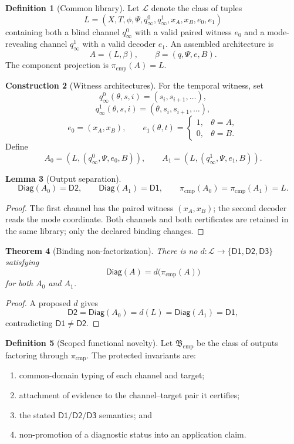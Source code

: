 \documentclass[11pt]{article}
\newcommand{\Diag}{\ensuremath{\mathsf{Diag}}}
\newcommand{\DOne}{\ensuremath{\mathsf{D1}}}
\newcommand{\DTwo}{\ensuremath{\mathsf{D2}}}
\newcommand{\DThree}{\ensuremath{\mathsf{D3}}}
\newcommand{\Lib}{\ensuremath{\mathcal L}}
\newcommand{\Base}{\ensuremath{\mathfrak B}}
\theoremstyle{plain}
\newtheorem{theorem}{Theorem}[section]
\newtheorem{lemma}[theorem]{Lemma}
\theoremstyle{definition}
\newtheorem{definition}[theorem]{Definition}
\newtheorem{construction}[theorem]{Construction}
\theoremstyle{remark}
\begin{document}
\begin{definition}[Common library]
Let $\Lib$ denote the class of tuples
\[
L=(X,T,\phi,\Psi,q^0_\infty,q^1_\infty,x_A,x_B,e_0,e_1)
\]
containing both a blind channel $q^0_\infty$ with a valid paired witness $e_0$
and a mode-revealing channel $q^1_\infty$ with a valid decoder $e_1$.
An assembled architecture is
\[
A=(L,\beta),\qquad\beta=(q,\Psi,e,B).
\]
The component projection is $\pi_{\mathrm{cmp}}(A)=L$.
\end{definition}

\begin{construction}[Witness architectures]
For the temporal witness, set
\[
q^0_\infty(\theta,s,i)=(s_i,s_{i+1},\ldots),
\]
\[
q^1_\infty(\theta,s,i)=(\theta,s_i,s_{i+1},\ldots),
\]
\[
e_0=(x_A,x_B),\qquad
 e_1(\theta,t)=\begin{cases}1,&\theta=A,\\0,&\theta=B.\end{cases}
\]
Define
\[
A_0=(L,(q^0_\infty,\Psi,e_0,B)),
\qquad
A_1=(L,(q^1_\infty,\Psi,e_1,B)).
\]
\end{construction}

\begin{lemma}[Output separation]
\label{lem:outputs}
\[
\Diag(A_0)=\DTwo,\qquad\Diag(A_1)=\DOne,
\qquad\pi_{\mathrm{cmp}}(A_0)=\pi_{\mathrm{cmp}}(A_1)=L.
\]
\end{lemma}

\begin{proof}
The first channel has the paired witness $(x_A,x_B)$; the second decoder reads the
mode coordinate.  Both channels and both certificates are retained in the same
library; only the declared binding changes.
\end{proof}

\begin{theorem}[Binding non-factorization]
\label{thm:binding-full}
There is no $d:\Lib\to\{\DOne,\DTwo,\DThree\}$ satisfying
\[
\Diag(A)=d\bigl(\pi_{\mathrm{cmp}}(A)\bigr)
\]
for both $A_0$ and $A_1$.
\end{theorem}

\begin{proof}
A proposed $d$ gives
\[
\DTwo=\Diag(A_0)=d(L)=\Diag(A_1)=\DOne,
\]
contradicting $\DOne\ne\DTwo$.
\end{proof}

\begin{definition}[Scoped functional novelty]
Let $\Base_{\mathrm{cmp}}$ be the class of outputs factoring through
$\pi_{\mathrm{cmp}}$.  The protected invariants are:
\begin{enumerate}[label=\textnormal{(I\arabic*)},leftmargin=2.6em]
\item common-domain typing of each channel and target;
\item attachment of evidence to the channel--target pair it certifies;
\item the stated $\DOne/\DTwo/\DThree$ semantics; and
\item non-promotion of a diagnostic status into an application claim.
\end{enumerate}
\end{definition}
\end{document}
